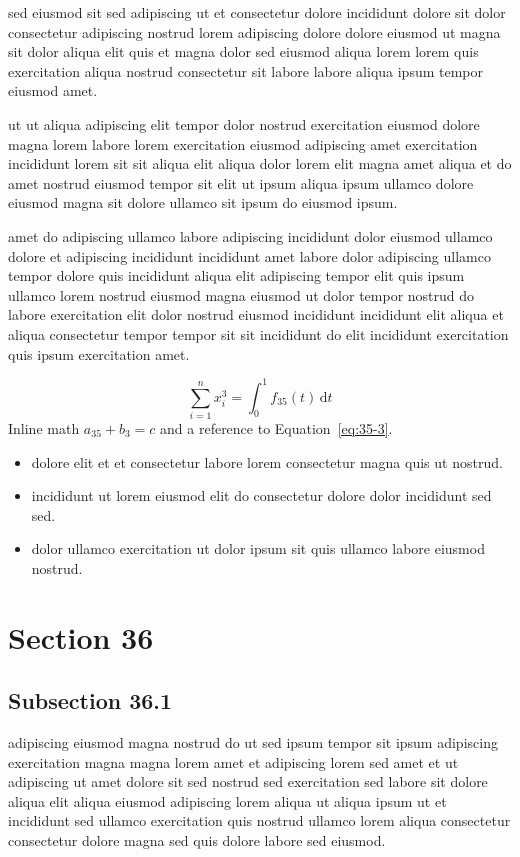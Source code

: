 \documentclass{article}
\begin{document}
sed eiusmod sit sed adipiscing ut et consectetur dolore incididunt dolore sit dolor consectetur adipiscing nostrud lorem adipiscing dolore dolore eiusmod ut magna sit dolor aliqua elit quis et magna dolor sed eiusmod aliqua lorem lorem quis exercitation aliqua nostrud consectetur sit labore labore aliqua ipsum tempor eiusmod amet.

ut ut aliqua adipiscing elit tempor dolor nostrud exercitation eiusmod dolore magna lorem labore lorem exercitation eiusmod adipiscing amet exercitation incididunt lorem sit sit aliqua elit aliqua dolor lorem elit magna amet aliqua et do amet nostrud eiusmod tempor sit elit ut ipsum aliqua ipsum ullamco dolore eiusmod magna sit dolore ullamco sit ipsum do eiusmod ipsum.

amet do adipiscing ullamco labore adipiscing incididunt dolor eiusmod ullamco dolore et adipiscing incididunt incididunt amet labore dolor adipiscing ullamco tempor dolore quis incididunt aliqua elit adipiscing tempor elit quis ipsum ullamco lorem nostrud eiusmod magna eiusmod ut dolor tempor nostrud do labore exercitation elit dolor nostrud eiusmod incididunt incididunt elit aliqua et aliqua consectetur tempor tempor sit sit incididunt do elit incididunt exercitation quis ipsum exercitation amet.

\begin{equation}\label{eq:35-3}
  \sum_{i=1}^{n} x_i^{3} = \int_0^1 f_{35}(t)\,\mathrm{d}t
\end{equation}
Inline math $a_{35} + b_{3} = c$ and a reference to Equation~\eqref{eq:35-3}.

\begin{itemize}
  \item dolore elit et et consectetur labore lorem consectetur magna quis ut nostrud.
  \item incididunt ut lorem eiusmod elit do consectetur dolore dolor incididunt sed sed.
  \item dolor ullamco exercitation ut dolor ipsum sit quis ullamco labore eiusmod nostrud.
\end{itemize}

\section{Section 36}\label{sec:36}
\subsection{Subsection 36.1}\label{sec:36-1}
adipiscing eiusmod magna nostrud do ut sed ipsum tempor sit ipsum adipiscing exercitation magna magna lorem amet et adipiscing lorem sed amet et ut adipiscing ut amet dolore sit sed nostrud sed exercitation sed labore sit dolore aliqua elit aliqua eiusmod adipiscing lorem aliqua ut aliqua ipsum ut et incididunt sed ullamco exercitation quis nostrud ullamco lorem aliqua consectetur consectetur dolore magna sed quis dolore labore sed eiusmod.
\end{document}
